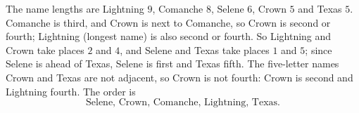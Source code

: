 The name lengths are Lightning $9$, Comanche $8$, Selene $6$, Crown $5$ and Texas $5$. Comanche is third, and Crown is next to Comanche, so Crown is second or fourth; Lightning (longest name) is also second or fourth. So Lightning and Crown take places $2$ and $4$, and Selene and Texas take places $1$ and $5$; since Selene is ahead of Texas, Selene is first and Texas fifth. The five-letter names Crown and Texas are not adjacent, so Crown is not fourth: Crown is second and Lightning fourth. The order is
\[\boxed{\text{Selene, Crown, Comanche, Lightning, Texas}}.\]
